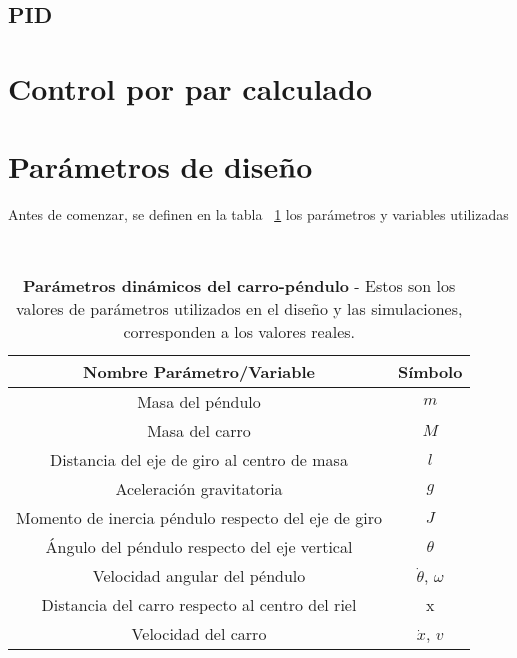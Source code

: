\subsection{PID}

\section{Control por par calculado}

\section{Parámetros de diseño}
Antes de comenzar, se definen  en la tabla ~\ref{tab:tabla} los parámetros y variables utilizadas

\begin{table}[htdp]                             %
\centering\                                     %
\begin{tabular}{||c | c ||}                     %
\hline                                          %
\hline
Nombre Parámetro/Variable & Símbolo\\
\hline
\hline
Masa del péndulo & $m$ \\
\hline
Masa del carro & $M$\\
\hline
Distancia del eje de giro al centro de masa & $l$ \\
\hline
Aceleración gravitatoria & $g$ \\
\hline
Momento de inercia péndulo respecto del eje de giro& $J$ \\
\hline
Ángulo del péndulo respecto del eje vertical & $\theta$\\
\hline
Velocidad angular del péndulo & $\dot{\theta}$, $\omega$\\
\hline
Distancia del carro respecto al centro del riel & x\\
\hline
Velocidad del carro & $\dot{x}$, $v$\\
\hline
\hline
\end{tabular}
\caption[Tabla 1]{\textbf{Parámetros dinámicos del carro-péndulo} - Estos son los valores de parámetros utilizados en el diseño y las simulaciones, corresponden a los valores reales.}
\label{tab:tabla}                              %
\end{table}
